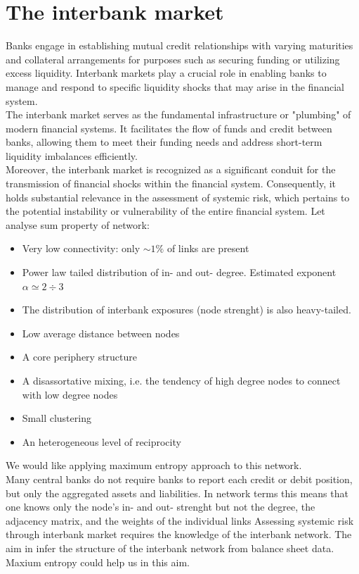 \section{The interbank market}
Banks engage in establishing mutual credit relationships with varying maturities and collateral arrangements for purposes such as securing funding or utilizing excess liquidity. Interbank markets play a crucial role in enabling banks to manage and respond to specific liquidity shocks that may arise in the financial system.\\
The interbank market serves as the fundamental infrastructure or "plumbing" of modern financial systems. It facilitates the flow of funds and credit between banks, allowing them to meet their funding needs and address short-term liquidity imbalances efficiently.\\
Moreover, the interbank market is recognized as a significant conduit for the transmission of financial shocks within the financial system. Consequently, it holds substantial relevance in the assessment of systemic risk, which pertains to the potential instability or vulnerability of the entire financial system.
Let analyse sum property of network:
\begin{itemize}
	\item Very low connectivity: only $\sim 1\%$ of links are present
	\item Power law tailed distribution of in- and out- degree. Estimated exponent $\alpha \simeq 2 ÷ 3$
	\item The distribution of interbank exposures (node strenght) is also heavy-tailed.
	\item Low average distance between nodes
	\item A core periphery structure
	\item A disassortative mixing, i.e. the tendency of high degree nodes to connect with low degree nodes
	\item Small clustering
	\item An heterogeneous level of reciprocity
\end{itemize}
We would like applying maximum entropy approach to this network.\\
Many central banks do not require banks to report each credit or debit position, but only the aggregated assets and liabilities. In network terms this means that one knows only the node’s in- and out- strenght but not the degree, the adjacency matrix, and the weights of the individual links Assessing systemic risk through interbank market requires the knowledge of the interbank network. The aim in infer the structure of the interbank network from balance sheet data. Maxium entropy could help us in this aim.\\
